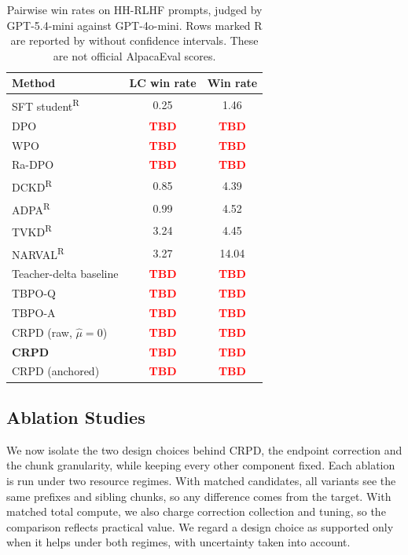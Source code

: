 \documentclass[pdflatex,sn-mathphys-num,review]{sn-jnl}
\theoremstyle{thmstyleone}
\theoremstyle{thmstyletwo}
\theoremstyle{thmstylethree}
\providecommand{\muhat}{\widehat{\mu}}
\newcommand{\tbd}[1][]{\textcolor{red}{\textbf{TBD#1}}}
\begin{document}
\begin{table}[t]
\centering
\small
\setlength{\tabcolsep}{4pt}
\renewcommand{\arraystretch}{1.1}
\begin{tabular}{lcc}
\toprule
\textbf{Method} & \textbf{LC win rate} & \textbf{Win rate} \\
\midrule
SFT student\textsuperscript{R} & 0.25 & 1.46 \\
DPO & \tbd & \tbd \\
WPO & \tbd & \tbd \\
Ra-DPO & \tbd & \tbd \\
DCKD\textsuperscript{R} & 0.85 & 4.39 \\
ADPA\textsuperscript{R} & 0.99 & 4.52 \\
TVKD\textsuperscript{R} & 3.24 & 4.45 \\
NARVAL\textsuperscript{R} & 3.27 & 14.04 \\
Teacher-delta baseline & \tbd & \tbd \\
TBPO-Q & \tbd & \tbd \\
TBPO-A & \tbd & \tbd \\
CRPD (raw, $\muhat=0$) & \tbd & \tbd \\
\rowcolor{gray!20}
\textbf{CRPD} & \tbd & \tbd \\
CRPD (anchored) & \tbd & \tbd \\
\bottomrule
\end{tabular}
\caption{Pairwise win rates on HH-RLHF prompts, judged by GPT-5.4-mini against GPT-4o-mini. Rows marked R are reported by \citet{van2026narval} without confidence intervals. These are not official AlpacaEval scores.}
\label{tab:hhrlhf}
\end{table}

\subsection{Ablation Studies}
\label{sec:ablation}

We now isolate the two design choices behind CRPD, the endpoint correction and the chunk granularity, while keeping every other component fixed. Each ablation is run under two resource regimes. With matched candidates, all variants see the same prefixes and sibling chunks, so any difference comes from the target. With matched total compute, we also charge correction collection and tuning, so the comparison reflects practical value. We regard a design choice as supported only when it helps under both regimes, with uncertainty taken into account.
\end{document}
